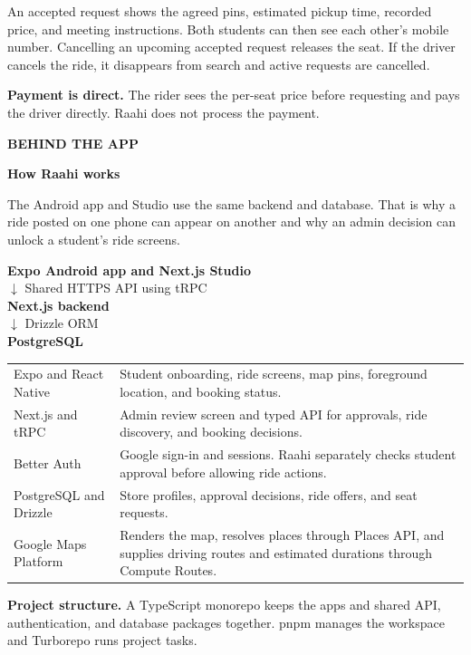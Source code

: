 \documentclass[11pt,a4paper]{article}
\newcommand{\kicker}[1]{{\small\bfseries\textcolor{Pine}{\MakeUppercase{#1}}}\par}
\newcommand{\pageheading}[2]{%
  \pdfbookmark[0]{#2}{guide-page-\thepage}%
  \kicker{#1}%
  {\fontsize{31}{35}\selectfont\bfseries\textcolor{Ink}{#2}\par}%
  \vspace{2pt}%
}
\newcommand{\subhead}[1]{\par\addvspace{8pt}{\large\bfseries\textcolor{Pine}{#1}}\par\nopagebreak[4]}
\newcommand{\panel}[1]{%
  \par\noindent\colorbox{Wash}{\parbox{\dimexpr\linewidth-2\fboxsep\relax}{\setlength{\parskip}{4pt}#1}}\par
}
\begin{document}
An accepted request shows the agreed pins, estimated pickup time, recorded price, and meeting instructions. Both students can then see each other's mobile number. Cancelling an upcoming accepted request releases the seat. If the driver cancels the ride, it disappears from search and active requests are cancelled.

\textbf{Payment is direct.} The rider sees the per-seat price before requesting and pays the driver directly. Raahi does not process the payment.

\newpage
\pageheading{Behind the app}{How Raahi works}

The Android app and Studio use the same backend and database. That is why a ride posted on one phone can appear on another and why an admin decision can unlock a student's ride screens.

\panel{\centering
  \textbf{Expo Android app and Next.js Studio}\\[3pt]
  \(\downarrow\) \enspace Shared HTTPS API using tRPC\\[3pt]
  \textbf{Next.js backend}\\[3pt]
  \(\downarrow\) \enspace Drizzle ORM\\[3pt]
  \textbf{PostgreSQL}}

\subhead{Technology and responsibilities}
\begin{tabularx}{\linewidth}{@{}L{46mm}@{\hspace{5mm}}Y@{}}
\toprule
Expo and React Native & Student onboarding, ride screens, map pins, foreground location, and booking status. \\
Next.js and tRPC & Admin review screen and typed API for approvals, ride discovery, and booking decisions. \\
Better Auth & Google sign-in and sessions. Raahi separately checks student approval before allowing ride actions. \\
PostgreSQL and Drizzle & Store profiles, approval decisions, ride offers, and seat requests. \\
Google Maps Platform & Renders the map, resolves places through Places API, and supplies driving routes and estimated durations through Compute Routes. \\
\bottomrule
\end{tabularx}

\textbf{Project structure.} A TypeScript monorepo keeps the apps and shared API, authentication, and database packages together. pnpm manages the workspace and Turborepo runs project tasks.
\end{document}
